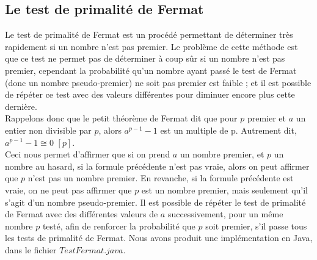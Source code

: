 		\subsection{Le test de primalité de Fermat}
			Le test de primalité de Fermat est un procédé permettant de déterminer très rapidement si un nombre n'est pas premier. Le problème de cette méthode est que ce test ne permet pas de déterminer à coup sûr si un nombre n'est pas premier, cependant la probabilité qu'un nombre ayant passé le test de Fermat (donc un nombre pseudo-premier) ne soit pas premier est faible ; et il est possible de répéter ce test avec des valeurs différentes pour diminuer encore plus cette dernière.\\
			Rappelons donc que le petit théorème de Fermat dit que pour $p$ premier et $a$ un entier non divisible par $p$, alors $a^{p-1} - 1$ est un multiple de p. Autrement dit, $a^{p-1}-1\cong{0}$ $[p]$.\\
			Ceci nous permet d'affirmer que si on prend $a$ un nombre premier, et $p$ un nombre au hasard, si la formule précédente n'est pas vraie, alors on peut affirmer que $p$ n'est pas un nombre premier. En revanche, si la formule précédente est vraie, on ne peut pas affirmer que $p$ est un nombre premier, mais seulement qu'il s'agit d'un nombre pseudo-premier. Il est possible de répéter le test de primalité de Fermat avec des différentes valeurs de $a$ successivement, pour un même nombre $p$ testé, afin de renforcer la probabilité que $p$ soit premier, s'il passe tous les tests de primalité de Fermat. Nous avons produit une implémentation en Java, dans le fichier $TestFermat.java$.
